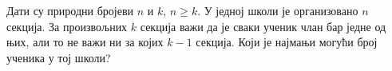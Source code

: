 \problem
Дати су природни бројеви $n$ и $k$, $n \geq k$.
У једној школи је организовано $n$ секција.
За произвољних $k$ секција важи да је сваки ученик члан бар једне од њих, али
то не важи ни за којих $k-1$ секција.
Који је најмањи могући број ученика у тој школи?

\solution

\endproblem
